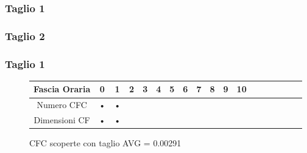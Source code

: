 \documentclass[10pt,a4paper]{article}
\begin{document}
\subsubsection{Taglio 1}



\subsubsection{Taglio 2}

\subsubsection{Taglio 1}



\begin{figure}[h]
\begin{center}
\begin{tabular}{|c|c|c|c|c|c|c|c|c|c|c|c|c|c|c|c|c|c|}
\hline 
Fascia Oraria & 0 & 1 & 2 & 3 & 4 & 5 & 6 & 7 & 8 & 9 & 10 &  \\ 
\hline 
Numero CFC & • & • \\ 
\hline 
Dimensioni CF & • & • \\ 
\hline 
\end{tabular} 
\caption{CFC scoperte con taglio AVG = 0.00291}
\end{center}
\end{figure}
\end{document}
